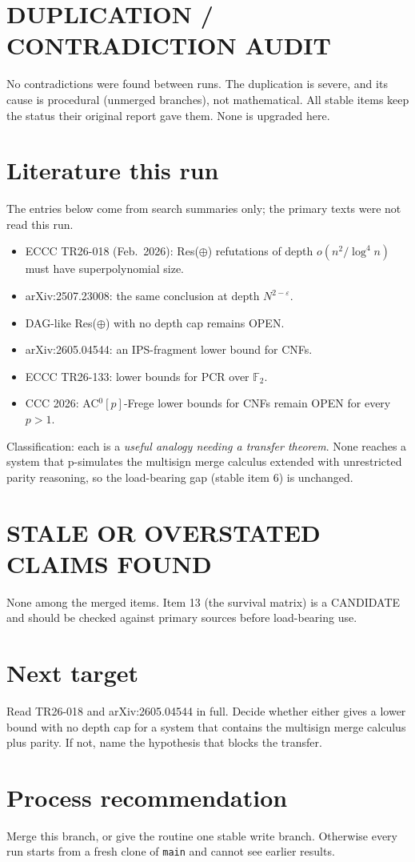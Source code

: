 \documentclass[11pt]{article}
\begin{document}
\section*{DUPLICATION / CONTRADICTION AUDIT}
No contradictions were found between runs. The duplication is severe, and its cause is
procedural (unmerged branches), not mathematical. All stable items keep the status their
original report gave them. None is upgraded here.

\section*{Literature this run}
The entries below come from search summaries only; the primary texts were not read this run.
\begin{itemize}
\item ECCC TR26-018 (Feb.\ 2026): Res($\oplus$) refutations of depth $o(n^2/\log^4 n)$ must have
  superpolynomial size.
\item arXiv:2507.23008: the same conclusion at depth $N^{2-\varepsilon}$.
\item DAG-like Res($\oplus$) with no depth cap remains OPEN.
\item arXiv:2605.04544: an IPS-fragment lower bound for CNFs.
\item ECCC TR26-133: lower bounds for PCR over $\mathbb F_2$.
\item CCC 2026: AC$^0[p]$-Frege lower bounds for CNFs remain OPEN for every $p>1$.
\end{itemize}
Classification: each is a \emph{useful analogy needing a transfer theorem}. None reaches a
system that p-simulates the multisign merge calculus extended with unrestricted parity
reasoning, so the load-bearing gap (stable item 6) is unchanged.

\section*{STALE OR OVERSTATED CLAIMS FOUND}
None among the merged items. Item 13 (the survival matrix) is a CANDIDATE and should be
checked against primary sources before load-bearing use.

\section*{Next target}
Read TR26-018 and arXiv:2605.04544 in full. Decide whether either gives a lower bound with
no depth cap for a system that contains the multisign merge calculus plus parity. If not,
name the hypothesis that blocks the transfer.

\section*{Process recommendation}
Merge this branch, or give the routine one stable write branch. Otherwise every run starts
from a fresh clone of \texttt{main} and cannot see earlier results.

\end{document}
